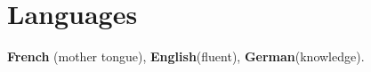 \documentclass[10pt,a4paper,sans]{moderncv}   %
\begin{document}
\vspace*{-0.2cm}

\section{Languages}
\textbf{French} (mother tongue), \textbf{English}(fluent), \textbf{German}(knowledge).
\vspace*{0.3cm}






{\footnotesize


}



\end{document}

